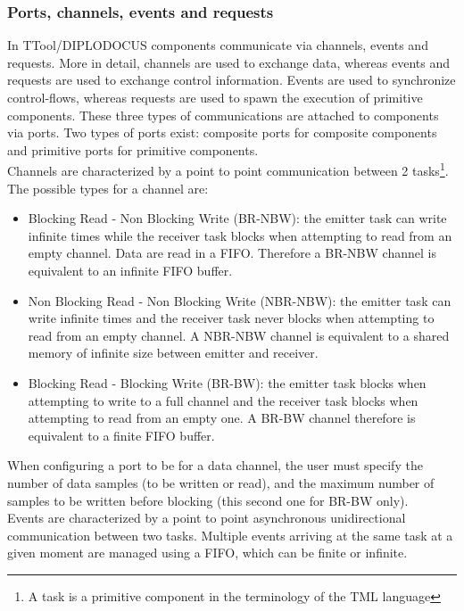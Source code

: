 \documentclass{llncs}
\begin{document}
\subsubsection{Ports, channels, events and requests}
%
In TTool/DIPLODOCUS components communicate via channels, events and requests. More in detail, channels are used to
exchange data, whereas events and requests are used to exchange control information. Events are used to synchronize
control-flows, whereas requests are used to spawn the execution of primitive components. These three types of
communications are attached to components via ports. Two types of ports exist: composite ports for composite components
and primitive ports for primitive components.\\
%
Channels are characterized by a point to point communication between 2 tasks\footnote{A task is a primitive component in
the terminology of the TML language}. The possible types for a channel are: 
%
\begin{itemize}
    \item Blocking Read - Non Blocking Write (BR-NBW): the emitter task can write infinite times while the receiver task
        blocks when attempting to read from an empty channel. Data are read in a FIFO. Therefore a BR-NBW channel is
        equivalent to an infinite FIFO buffer.
    \item Non Blocking Read - Non Blocking Write (NBR-NBW): the emitter task can write infinite times and the receiver
        task never blocks when attempting to read from an empty channel. A NBR-NBW channel is equivalent to a shared
        memory of infinite size between emitter and receiver.
    \item Blocking Read - Blocking Write (BR-BW): the emitter task blocks when attempting to write to a full channel and
        the receiver task blocks when attempting to read from an empty one. A BR-BW channel therefore is equivalent to a
        finite FIFO buffer.
\end{itemize}
%
When configuring a port to be for a data channel, the user must specify the number of data samples (to be written or
read), and the maximum number of samples to be written before blocking (this second one for BR-BW only).\\
%
Events are characterized by a point to point asynchronous unidirectional communication between two tasks. Multiple
events arriving at the same task at a given moment are managed using a FIFO, which can be finite or infinite.
%
\end{document}
